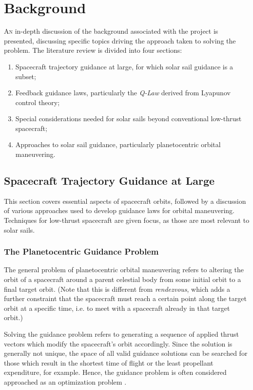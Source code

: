 \chapter{Background}

\lettrine{A}{n} in-depth discussion of the background associated with the project is presented, discussing specific topics driving the approach taken to solving the problem. The literature review is divided into four sections:
\begin{enumerate}
  \item Spacecraft trajectory guidance at large, for which solar sail guidance is a subset;
  \item Feedback guidance laws, particularly the \textit{Q-Law} derived from Lyapunov control theory;
  \item Special considerations needed for solar sails beyond conventional low-thrust spacecraft;
  \item Approaches to solar sail guidance, particularly planetocentric orbital maneuvering.
\end{enumerate}

\section{Spacecraft Trajectory Guidance at Large}

This section covers essential aspects of spacecraft orbits, followed by a discussion of various approaches used to develop guidance laws for orbital maneuvering. Techniques for low-thrust spacecraft are given focus, as those are most relevant to solar sails.

\subsection{The Planetocentric Guidance Problem}
The general problem of planetocentric orbital maneuvering refers to altering the orbit of a spacecraft around a parent celestial body from some initial orbit to a final target orbit. (Note that this is different from \textit{rendezvous}, which adds a further constraint that the spacecraft must reach a certain point along the target orbit at a specific time, i.e. to meet with a spacecraft already in that target orbit.)



Solving the guidance problem refers to generating a sequence of applied thrust vectors which modify the spacecraft's orbit accordingly. Since the solution is generally not unique, the space of all valid guidance solutions can be searched for those which result in the shortest time of flight or the least propellant expenditure, for example. Hence, the guidance problem is often considered approached as an optimization problem \cite{yam2011low}.

